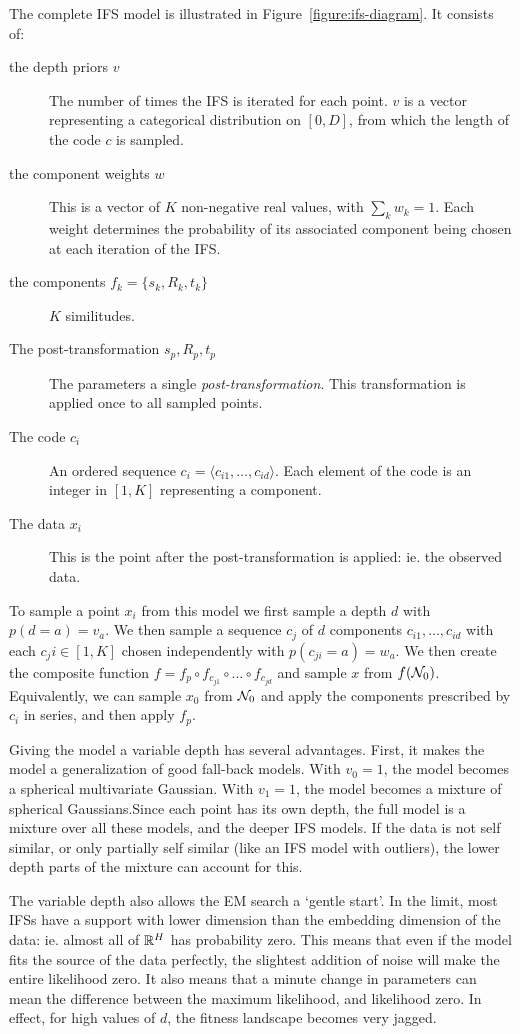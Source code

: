 The complete IFS model is illustrated in Figure~\ref{figure:ifs-diagram}. It consists of:
\begin{description}
\item[the depth  priors $v$] The number of times the IFS is iterated for each point. $v$ is a vector representing a categorical distribution on $[0,D]$, from which the length of the code $c$ is sampled.
\item[the component weights $w$] This is a vector of $K$ non-negative real values, with $\sum_k w_k = 1$. Each weight determines the probability of its associated component being chosen at each iteration of the IFS.
\item[the components $f_k = \{s_k, R_k, t_k\}$] $K$ similitudes. 
\item[The post-transformation $s_p, R_p, t_p$] The parameters a single \emph{post-transformation}. This transformation is applied once to all sampled points.
\item[The code $c_i$] An ordered sequence $c_i = \langle c_{i1}, \ldots, c_{id} \rangle$. Each element of the code is an integer in $[1,K]$ representing a component. 
\item[The data $x_i$] This is the point after the post-transformation is applied: ie. the observed data.
\end{description}

To sample a point $x_i$ from this model we first sample a depth $d$ with $p(d=a) = v_a$. We then sample a sequence $c_j$ of $d$ components $c_{i1}, \ldots, c_{id}$ with each $c_ji \in [1,K]$ chosen independently with $p(c_{ji} = a) = w_a$. We then create the composite function $f = f_p \circ f_{c_{j1}} \circ \ldots \circ f_{c_{jd}}$ and sample $x$ from $f({\cal N}_0)$. Equivalently, we can sample $x_0$ from ${\cal N}_0$ and apply the components prescribed by $c_i$ in series, and then apply $f_p$.

Giving the model a variable depth has several advantages. First, it makes the model a generalization of good fall-back models. With $v_0 = 1$, the model becomes a spherical multivariate Gaussian. With $v_1 = 1$, the model becomes a mixture of spherical Gaussians.\footnotemark Since each point has its own depth, the full model is a mixture over all these models, and the deeper IFS models. If the data is not self similar, or only partially self similar (like an IFS model with outliers), the lower depth parts of the mixture can account for this.

The variable depth also allows the EM search a `gentle start'. In the limit, most IFSs have a support with lower dimension than the embedding dimension of the data: ie. almost all of ${\mathbb R}^H$ has probability zero. This means that even if the model fits the source of the data perfectly, the slightest addition of noise will make the entire likelihood zero. It also means that a minute change in parameters can mean the difference between the maximum likelihood, and likelihood zero. In effect, for high values of $d$, the fitness landscape becomes very jagged. 

